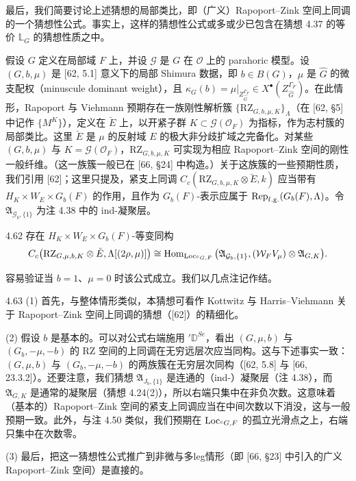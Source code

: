 最后，我们简要讨论上述猜想的局部类比，即（广义）Rapoport–Zink 空间上同调的一个猜想性公式。事实上，这样的猜想性公式或多或少已包含在猜想 4.37 的等价 $\mathbb L_G$ 的猜想性质之中。

假设 $G$ 定义在局部域 $F$ 上，并设 $\mathcal G$ 是 $G$ 在 $\mathcal O$ 上的 parahoric 模型。设 $(G,b,\mu)$ 是 [62, 5.1] 意义下的局部 Shimura 数据，即 $b\in B(G)$，$\mu$ 是 $\hat G$ 的微支配权（minuscule dominant weight），且 $\kappa_G(b)=\mu|_{Z^{\Gamma_F}_{\hat G}}\in X^{\bullet}(Z^{\Gamma_F}_{\hat G})$。在此情形，Rapoport 与 Viehmann 预期存在一族刚性解析簇 $\{\mathrm{RZ}_{G,b,\mu,K}\}_\Lambda$（在 [62, §5] 中记作 $\{M^K\}$），定义在 $\breve E$ 上，以开紧子群 $K\subset\mathcal G(\mathcal O_F)$ 为指标，作为志村簇的局部类比。这里 $\breve E$ 是 $\mu$ 的反射域 $E$ 的极大非分歧扩域之完备化。对某些 $(G,b,\mu)$ 与 $K=\mathcal G(\mathcal O_F)$，$\mathrm{RZ}_{G,b,\mu,K}$ 可实现为相应 Rapoport–Zink 空间的刚性一般纤维。（这一族簇一般已在 [66, §24] 中构造。）关于这族簇的一些预期性质，我们引用 [62]；这里只提及，紧支上同调 $C_c(\mathrm{RZ}_{G,b,\mu,K}\otimes\breve E,k)$ 应当带有 $H_K\times W_E\times G_b(F)$ 的作用，且作为 $G_b(F)$-表示应属于 $\operatorname{Rep}_{\mathrm{f.g.}}(G_b(F),\Lambda)$。令 $\mathfrak A_{\mathcal G_b,\{1\}}$ 为注 4.38 中的 ind-凝聚层。

\begin{conj}{4.62}\label{thm:a2-4-62}
存在 $H_K\times W_E\times G_b(F)$-等变同构
\[
C_c\big(\mathrm{RZ}_{G,\mu,b,K}\otimes\breve E,\Lambda[(2\rho,\mu)]\big)\cong\operatorname{Hom}_{\operatorname{Loc}_{{}^cG,F}}\big(\mathfrak A_{\mathcal G_b,\{1\}},(\mathcal W_FV_\mu)\otimes\mathfrak A_{G,K}\big).
\]
\end{conj}
容易验证当 $b=1$、$\mu=0$ 时该公式成立。我们以几点注记作结。

\begin{rem}{4.63}\label{thm:a2-4-63}
(1) 首先，与整体情形类似，本猜想可看作 Kottwitz 与 Harris–Viehmann 关于 Rapoport–Zink 空间上同调的猜想（[62]）的精细化。

(2) 假设 $b$ 是基本的。可以对公式右端施用 ${}'{\mathbb D}^{Se}$，看出 $(G,\mu,b)$ 与 $(G_b,-\mu,-b)$ 的 RZ 空间的上同调在无穷远层次应当同构。这与下述事实一致：$(G,\mu,b)$ 与 $(G_b,-\mu,-b)$ 的两族簇在无穷层次同构（[62, 5.8] 与 [66, 23.3.2]）。还要注意，我们猜想 $\mathfrak A_{J_b,\{1\}}$ 是连通的（ind-）凝聚层（注 4.38），而 $\mathfrak A_{G,K}$ 是通常的凝聚层（猜想 4.24(2)），所以右端只集中在非负次数。这意味着（基本的）Rapoport–Zink 空间的紧支上同调应当在中间次数以下消没，这与一般预期一致。此外，与注 4.50 类似，我们预期在 $\operatorname{Loc}_{{}^cG,F}$ 的孤立光滑点之上，右端只集中在次数零。

(3) 最后，把这一猜想性公式推广到非微与多leg情形（即 [66, §23] 中引入的广义 Rapoport–Zink 空间）是直接的。
\end{rem}

